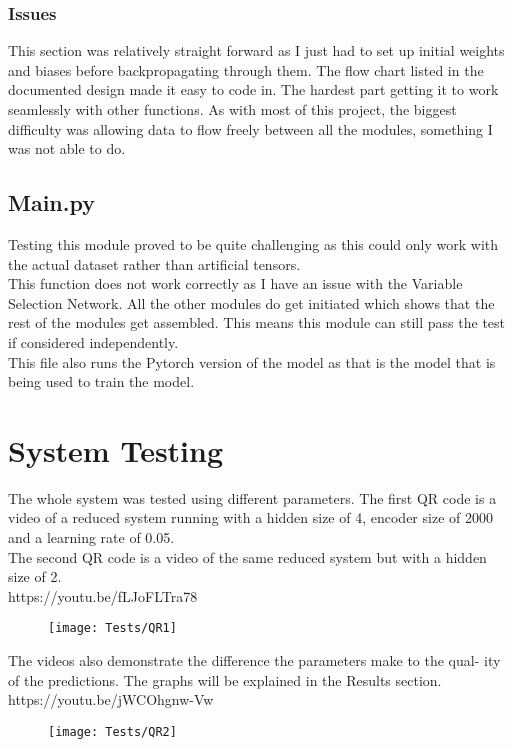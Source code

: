 \documentclass{article}
\begin{document}
\subsubsection{Issues}
This section was relatively straight forward as I just had to set up initial
weights and biases before backpropagating through them. The flow chart listed in
the documented design made it easy to code in. The hardest part getting it to
work seamlessly with other functions. As with most of this project, the biggest
difficulty was allowing data to flow freely between all the modules, something I
was not able to do.

\subsection{Main.py}
Testing this module proved to be quite challenging as this could only work with
the actual dataset rather than artificial tensors.
\\
This function does not work correctly as I have an issue with the Variable Selection Network.
All the other modules do get initiated which shows that the rest of the modules get assembled.
This means this module can still pass the test if considered independently.
\\This file also runs the Pytorch version of the model as that is the model that
is being used to train the model.
\clearpage
\section{System Testing}

The whole system was tested using different parameters. The first QR code is a
video of a reduced system running with a hidden size of 4, encoder size of 2000
and a learning rate of 0.05.\\
The second QR code is a video of the same reduced system but with a hidden
size of 2.
\\https://youtu.be/fLJoFLTra78
\begin{figure}[H]
    \centering
    \texttt{[image: Tests/QR1]}
\end{figure}
The videos also demonstrate the difference the parameters make to the qual-
ity of the predictions. The graphs will be explained in the Results section.
\\https://youtu.be/jWCOhgnw-Vw
\begin{figure}[H]
    \centering
    \texttt{[image: Tests/QR2]}
\end{figure}
\end{document}
